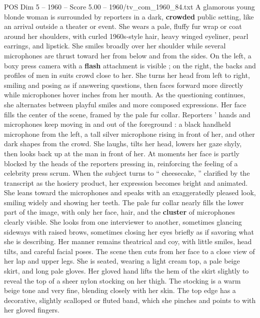 \begin{textsample}{POS Dim 5 – 1960 – Score 5.00 – 1960/tv\_com\_1960\_84.txt}  \label{ex:f5_pos_059}
A glamorous young blonde woman is surrounded by reporters in a dark, \textbf{crowded} public setting, like an arrival outside a theater or event.
She wears a pale, fluffy fur wrap or coat around her shoulders, with curled 1960s-style hair, heavy winged eyeliner, pearl earrings, and lipstick.
She smiles broadly over her shoulder while several microphones are thrust toward her from below and from the sides.
On the left, a boxy press camera with a \textbf{flash} attachment is visible ; on the right, the backs and profiles of men in suits crowd close to her.
She turns her head from left to right, smiling and posing as if answering questions, then faces forward more directly while microphones hover inches from her mouth.
As the questioning continues, she alternates between playful smiles and more composed expressions.
Her face fills the center of the scene, framed by the pale fur collar.
Reporters ’ hands and microphones keep moving in and out of the foreground : a black handheld microphone from the left, a tall silver microphone rising in front of her, and other dark shapes from the crowd.
She laughs, tilts her head, lowers her gaze shyly, then looks back up at the man in front of her.
At moments her face is partly blocked by the heads of the reporters pressing in, reinforcing the feeling of a celebrity press scrum.
When the subject turns to “ cheesecake, ” clarified by the transcript as the hosiery product, her expression becomes bright and animated.
She leans toward the microphones and speaks with an exaggeratedly pleased look, smiling widely and showing her teeth.
The pale fur collar nearly fills the lower part of the image, with only her face, hair, and the \textbf{cluster} of microphones clearly visible.
She looks from one interviewer to another, sometimes glancing sideways with raised brows, sometimes closing her eyes briefly as if savoring what she is describing.
Her manner remains theatrical and coy, with little smiles, head tilts, and careful facial poses.
The scene then cuts from her face to a close view of her lap and upper legs.
She is seated, wearing a light cream top, a pale beige skirt, and long pale gloves.
Her gloved hand lifts the hem of the skirt slightly to reveal the top of a sheer nylon stocking on her thigh.
The stocking is a warm beige tone and very fine, blending closely with her skin.
The top edge has a decorative, slightly scalloped or fluted band, which she pinches and points to with her gloved fingers.

\end{textsample}
